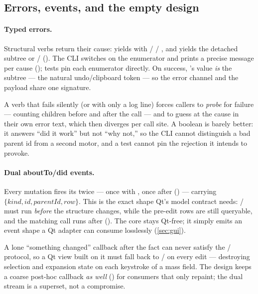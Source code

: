 \subsection{Errors, events, and the empty design}\label{sec:tradeoffs-errors}

\paragraph{Typed  errors.}
Structural verbs return their cause:  yields
 with  /  /
, and  yields the detached subtree or
 /  (). The CLI switches
on the enumerator and prints a precise message per cause ();
tests pin each enumerator directly. On success, 's value \emph{is} the
subtree --- the natural undo/clipboard token --- so the error channel and the payload
share one signature.

\begin{rejected}
A verb that fails silently (or with only a log line) forces callers to \emph{probe} for
failure --- counting children before and after the call --- and to guess at the cause in
their own error text, which then diverges per call site. A boolean is barely better: it
answers ``did it work'' but not ``why not,'' so the CLI cannot distinguish a bad parent
id from a second motor, and a test cannot pin the rejection it intends to provoke.
\end{rejected}

\paragraph{Dual aboutTo/did events.}
Every mutation fires its  twice --- once with , once
after () --- carrying
$\{kind, id, parentId, row\}$. This is the exact shape Qt's model contract needs:
/ must run \emph{before} the structure
changes, while the pre-edit rows are still queryable, and the matching  call
runs after (). The core stays Qt-free; it simply emits
an event shape a Qt adapter can consume losslessly (\cref{sec:gui}).

\begin{rejected}
A lone ``something changed'' callback after the fact can never satisfy the
/ protocol, so a Qt view built on it must fall back to
/ on every edit --- destroying selection and
expansion state on each keystroke of a mass field. The design keeps a coarse post-hoc
callback \emph{as well} () for consumers that only
repaint; the dual stream is a superset, not a compromise.
\end{rejected}

